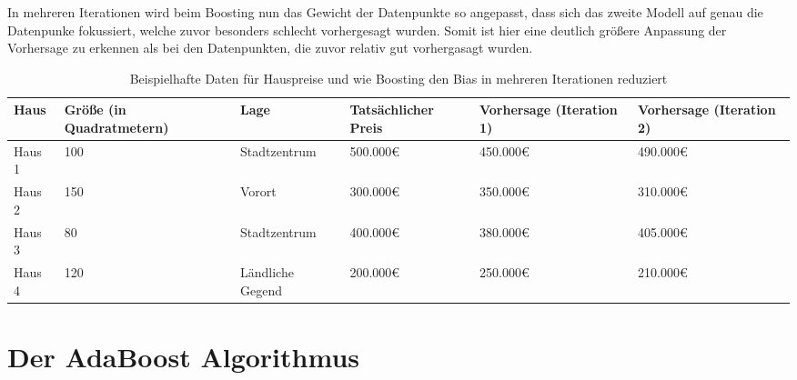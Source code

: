 \documentclass[11pt,a4paper,oneside]{scrartcl}
\begin{document}
In mehreren Iterationen wird beim Boosting nun das Gewicht der Datenpunkte so angepasst, dass sich das
zweite Modell auf genau die Datenpunke fokussiert, welche zuvor besonders schlecht vorhergesagt wurden.
Somit ist hier eine deutlich größere Anpassung der Vorhersage zu erkennen als bei den Datenpunkten, die zuvor
relativ gut vorhergasagt wurden.

\begin{table}[h]
    \centering
    \begin{tabularx}{\textwidth}{|X|X|X|X|X|X|}
        \hline
        \textbf{Haus} & \textbf{Größe (in Quadratmetern)} & \textbf{Lage}    & \textbf{Tatsächlicher Preis} & \textbf{Vorhersage (Iteration 1)} & \textbf{Vorhersage (Iteration 2)} \\
        \hline
        Haus 1        & 100                               & Stadtzentrum     & 500.000€                     & 450.000€                          & 490.000€                          \\
        \hline
        Haus 2        & 150                               & Vorort           & 300.000€                     & 350.000€                          & 310.000€                          \\
        \hline
        Haus 3        & 80                                & Stadtzentrum     & 400.000€                     & 380.000€                          & 405.000€                          \\
        \hline
        Haus 4        & 120                               & Ländliche Gegend & 200.000€                     & 250.000€                          & 210.000€                          \\
        \hline
    \end{tabularx}
    \caption{Beispielhafte Daten für Hauspreise und wie Boosting den Bias in mehreren Iterationen reduziert}
\end{table}

\section{Der AdaBoost Algorithmus}
\end{document}
